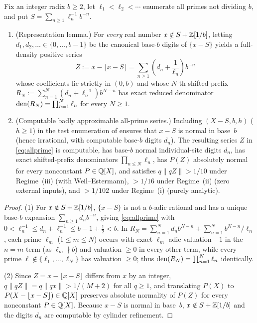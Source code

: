 \documentclass[11pt]{article}
\newcommand{\dist}[1]{\lVert #1\rVert}
\newcommand{\fr}[1]{\{#1\}}
\begin{document}
\begin{proposition}\label{prop:allprime}
Fix an integer radix $b\ge2$, let $\ell_1<\ell_2<\cdots$ enumerate all primes not dividing $b$, and put $S=\sum_{n\ge1}\ell_n^{-1}b^{-n}$.
\begin{enumerate}[label=\textup{(\arabic*)},nosep]
\item \textup{(Representation lemma.)} For \emph{every} real number $x\notin S+\mathbb Z[1/b]$, letting $d_1,d_2,\dots\in\{0,\dots,b-1\}$ be the canonical base-$b$ digits of $\fr{x-S}$ yields a full-density positive series
\begin{equation}\label{eq:allprime}
Z:=x-\lfloor x-S\rfloor=\sum_{n\ge1}\left(d_n+\frac1{\ell_n}\right)b^{-n}
\end{equation}
whose coefficients lie strictly in $(0,b)$ and whose $N$-th shifted prefix $R_N:=\sum_{n=1}^N(d_n+\ell_n^{-1})b^{N-n}$ has exact reduced denominator $\operatorname{den}(R_N)=\prod_{n=1}^N\ell_n$ for every $N\ge1$.
\item \textup{(Computable badly approximable all-prime series.)} Including $(X-S,b,h)$ ($h\ge1$) in the test enumeration of  ensures that $x-S$ is normal in base~$b$ (hence irrational, with computable base-$b$ digits $d_n$). The resulting series $Z$ in \eqref{eq:allprime} is computable, has base-$b$ normal individual-site digits $d_n$, has exact shifted-prefix denominators $\prod_{n\le N}\ell_n$, has $P(Z)$ absolutely normal for every nonconstant $P\in\mathbb Q[X]$, and satisfies $q\dist{qZ}>1/10$ under Regime~\textup{(iii)} (with Weil--Estermann), $>1/16$ under Regime~\textup{(ii)} (zero external inputs), and $>1/102$ under Regime~\textup{(i)} (purely analytic).
\end{enumerate}
\end{proposition}

\begin{proof}
(1) For $x\notin S+\mathbb Z[1/b]$, $\fr{x-S}$ is not a $b$-adic rational and has a unique base-$b$ expansion $\sum_{n\ge1}d_nb^{-n}$, giving \eqref{eq:allprime} with $0<\ell_n^{-1}\le d_n+\ell_n^{-1}\le b-1+\frac12<b$. In $R_N=\sum_{n=1}^Nd_nb^{N-n}+\sum_{n=1}^Nb^{N-n}/\ell_n$, each prime $\ell_m$ ($1\le m\le N$) occurs with exact $\ell_m$-adic valuation $-1$ in the $n=m$ term (as $\ell_m\nmid b$) and valuation $\ge0$ in every other term, while every prime $\ell\notin\{\ell_1,\dots,\ell_N\}$ has valuation $\ge0$; thus $\operatorname{den}(R_N)=\prod_{n=1}^N\ell_n$ identically.

(2) Since $Z=x-\lfloor x-S\rfloor$ differs from $x$ by an integer, $q\dist{qZ}=q\dist{qx}>1/(M+2)$ for all $q\ge1$, and translating $P(X)$ to $P(X-\lfloor x-S\rfloor)\in\mathbb Q[X]$ preserves absolute normality of $P(Z)$ for every nonconstant $P\in\mathbb Q[X]$. Because $x-S$ is normal in base~$b$, $x\notin S+\mathbb Z[1/b]$ and the digits $d_n$ are computable by cylinder refinement.
\end{proof}
\end{document}
